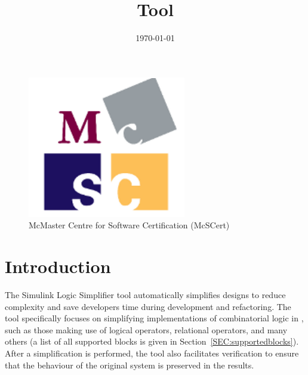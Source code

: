 \documentclass{article}
\title{\ToolName Tool}
\date{\monthyeardate\today}
\makeatletter
\newcommand{\ToolName}{Simulink Logic Simplifier\@\xspace}
\makeatother
\begin{document}
\maketitle
\vfill

\begin{figure}
	\centering
	\includegraphics[]{../figs/McSCert_Logo.pdf} \\
	McMaster Centre for Software Certification (McSCert)
\end{figure}

\newpage

\tableofcontents
\newpage

\section{Introduction}


The \ToolName tool automatically simplifies \Simulink designs to reduce complexity and save developers time during development and refactoring.
The tool specifically focuses on simplifying implementations of combinatorial logic in \Simulink, such as those making use of logical operators, relational operators, and many others (a list of all supported blocks is given in Section~\ref{SEC:supportedblocks}). After a simplification is performed, the tool also facilitates verification to ensure that the behaviour of the original system is preserved in the results.
\end{document}
